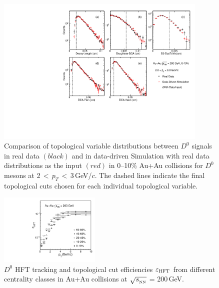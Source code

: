 \documentclass[%
 reprint,	
showpacs,
 amsmath,amssymb,
 aps,
 prc,
]{revtex4-1}
\begin{document}
\begin{figure}
\centering
\includegraphics[width=0.9\textwidth]{fig/DataTopo.pdf}
\caption{Comparison of topological variable distributions between $D^0$ signals in real data $(black)$ and in data-driven Simulation with real data distributions as the input $(red)$ in 0--10\% Au+Au collisions for $D^0$ mesons at 2\,$<$\,$p_T$\,$<$\,3\,GeV/$c$. The dashed lines indicate the final topological cuts chosen for each individual topological variable.}
\label{fig:DataTopo} 
\end{figure}

\begin{figure}[h]
\centering
\includegraphics[width=0.43\textwidth]{fig/Datad0Eff_hftTopo_10.pdf}
\caption{$D^{0}$ HFT tracking and topological cut efficiencies $\varepsilon_{\rm HFT}$ from different centrality classes in Au+Au collisions at $\sqrt{s_{_{\rm NN}}}$ = 200\,GeV.}
\label{fig:Datad0Eff_hftTopo} 
\end{figure}
\end{document}
